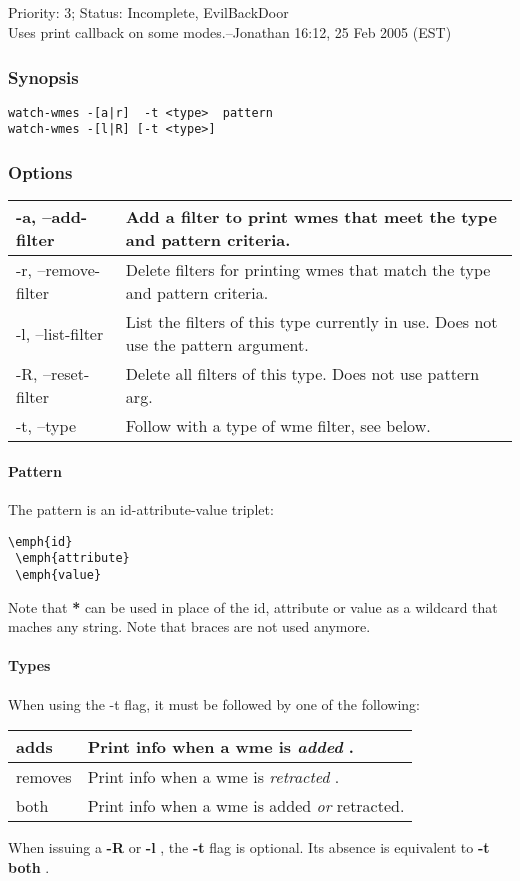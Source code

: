 \subsection{}
\label{watch-wmes}
 Priority: 3; Status: Incomplete, EvilBackDoor\\ 
Uses print callback on some modes.--Jonathan 16:12, 25 Feb 2005 (EST) 
\subsubsection*{Synopsis}
\begin{verbatim}
watch-wmes -[a|r]  -t <type>  pattern
watch-wmes -[l|R] [-t <type>]
\end{verbatim}
\subsubsection*{Options}
\begin{tabular}{|l|l|}
\hline 
 -a, --add-filter  & Add a filter to print wmes that meet the type and pattern criteria.  \\
 \hline 
 -r, --remove-filter  & Delete filters for printing wmes that match the type and pattern criteria.  \\
 \hline 
 -l, --list-filter  & List the filters of this type currently in use. Does not use the pattern argument.  \\
 \hline 
 -R, --reset-filter  & Delete all filters of this type. Does not use pattern arg.  \\
 \hline 
 -t, --type  & Follow with a type of wme filter, see below.  \\
 \hline 
\end{tabular}
\paragraph*{Pattern}
 The pattern is an id-attribute-value triplet: \begin{verbatim}
\emph{id}
 \emph{attribute}
 \emph{value}
\end{verbatim}
 Note that \textbf{*}
 can be used in place of the id, attribute or value as a wildcard that maches any string. Note that braces are not used anymore. 
\paragraph*{Types}
 When using the -t flag, it must be followed by one of the following: 
\begin{tabular}{|l|l|}
\hline 
 adds  & Print info when a wme is \emph{added}
.  \\
 \hline 
 removes  & Print info when a wme is \emph{retracted}
.  \\
 \hline 
 both  & Print info when a wme is added \emph{or}
 retracted.  \\
 \hline 
\end{tabular}
 When issuing a \textbf{-R}
 or \textbf{-l}
, the \textbf{-t}
 flag is optional. Its absence is equivalent to \textbf{-t both}
. 
